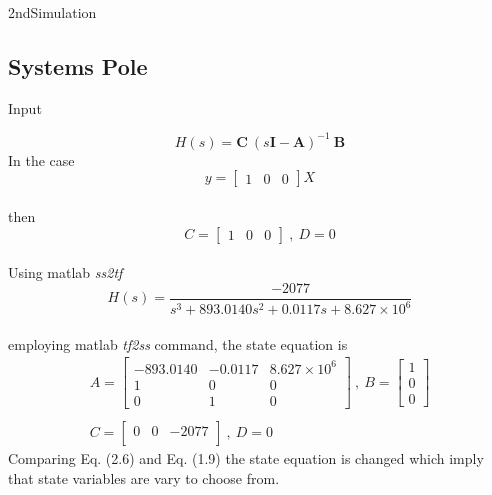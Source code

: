 \documentclass{article}
\begin{document}
\begin{homeworkProblem}{2nd}{Simulation}
\subsection{Systems Pole}
  Input

    \begin{equation}
      H(s) = \mathbf{C} ~ (s\mathbf{I}-\mathbf{A})^{-1} ~ \mathbf{B}
    \end{equation}
  In the case \\
    \begin{equation}
      y =     
      \begin{bmatrix}
        1    &  0   &   0
      \end{bmatrix} 
      X
    \end{equation}
  \\then\\
    \begin{equation}
      C =     
      \begin{bmatrix}
        1    &  0   &   0
      \end{bmatrix} 
      ~ , ~ 
      D = 0
    \end{equation}
  \\Using matlab \textit{ss2tf} \\
    \begin{equation}
      H(s) = \frac{-2077}{s^3+893.0140 s ^ 2 + 0.0117 s + 8.627 \times 10^6}
    \end{equation}
  \\employing matlab \textit{tf2ss} command, the state equation is\\
    \begin{equation}
      \begin{gathered}
        A = 
        \begin{bmatrix}
          -893.0140  & -0.0117   & 8.627 \times 10^6                                         \\
          1          & 0         & 0                                 \\
          0          & 1         & 0
        \end{bmatrix}
        ~,~
        B = 
        \begin{bmatrix}
          1\\
          0\\
          0
        \end{bmatrix}
        \\~\\
        C = 
        \begin{bmatrix}
          0       & 0         & -2077                                         \\
        \end{bmatrix}
        ~,~
        D = 0
      \end{gathered}
    \end{equation}
    Comparing Eq. (2.6) and Eq. (1.9) the state equation is changed which imply that state variables are vary to choose from.
  
  
  
  
  
  
\end{homeworkProblem}
\end{document}
